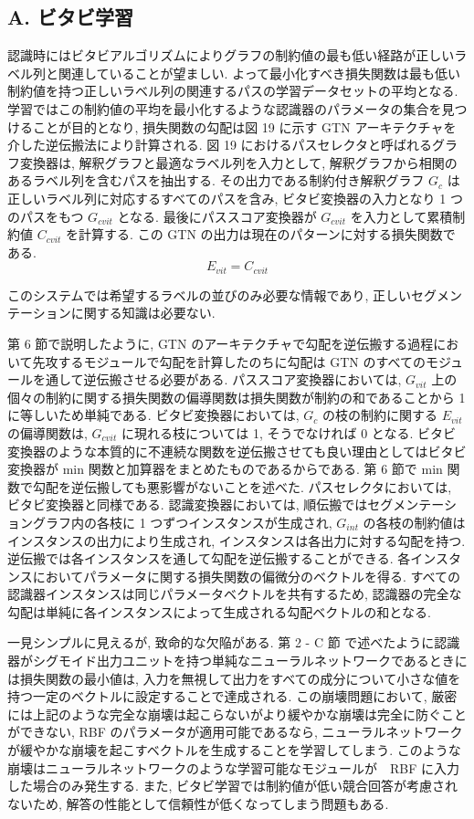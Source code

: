 \documentclass[twocolumn]{jarticle}     %
\begin{document}
\subsection*{A. ビタビ学習}
認識時にはビタビアルゴリズムによりグラフの制約値の最も低い経路が正しいラベル列と関連していることが望ましい. よって最小化すべき損失関数は最も低い制約値を持つ正しいラベル列の関連するパスの学習データセットの平均となる. 学習ではこの制約値の平均を最小化するような認識器のパラメータの集合を見つけることが目的となり, 損失関数の勾配は図 19 に示す GTN アーキテクチャを介した逆伝搬法により計算される. 
図 19 におけるパスセレクタと呼ばれるグラフ変換器は, 解釈グラフと最適なラベル列を入力として, 解釈グラフから相関のあるラベル列を含むパスを抽出する. 
その出力である制約付き解釈グラフ $G_c$ は正しいラベル列に対応するすべてのパスを含み, ビタビ変換器の入力となり 1 つのパスをもつ $G_{cvit}$ となる.
最後にパススコア変換器が $G_{cvit}$ を入力として累積制約値 $C_{cvit}$ を計算する. この GTN の出力は現在のパターンに対する損失関数である.
\begin{equation}
  E_{vit} = C_{cvit}
\end{equation}

このシステムでは希望するラベルの並びのみ必要な情報であり, 正しいセグメンテーションに関する知識は必要ない.
\par
第 6 節で説明したように, GTN のアーキテクチャで勾配を逆伝搬する過程において先攻するモジュールで勾配を計算したのちに勾配は GTN のすべてのモジュールを通して逆伝搬させる必要がある.
パススコア変換器においては, $G_{vit}$ 上の個々の制約に関する損失関数の偏導関数は損失関数が制約の和であることから 1 に等しいため単純である.
ビタビ変換器においては, $G_c$ の枝の制約に関する $E_{vit}$ の偏導関数は, $G_{cvit}$ に現れる枝については 1, そうでなければ 0 となる.
ビタビ変換器のような本質的に不連続な関数を逆伝搬させても良い理由としてはビタビ変換器が min 関数と加算器をまとめたものであるからである. 第 6 節で min 関数で勾配を逆伝搬しても悪影響がないことを述べた. 
パスセレクタにおいては, ビタビ変換器と同様である.
認識変換器においては, 順伝搬ではセグメンテーショングラフ内の各枝に 1 つずつインスタンスが生成され, $G_{int}$ の各枝の制約値はインスタンスの出力により生成され, インスタンスは各出力に対する勾配を持つ. 逆伝搬では各インスタンスを通して勾配を逆伝搬することができる. 各インスタンスにおいてパラメータに関する損失関数の偏微分のベクトルを得る. すべての認識器インスタンスは同じパラメータベクトルを共有するため, 認識器の完全な勾配は単純に各インスタンスによって生成される勾配ベクトルの和となる. 
\par
一見シンプルに見えるが, 致命的な欠陥がある. 第 2 - C 節 で述べたように認識器がシグモイド出力ユニットを持つ単純なニューラルネットワークであるときには損失関数の最小値は, 入力を無視して出力をすべての成分について小さな値を持つ一定のベクトルに設定することで達成される.
この崩壊問題において, 厳密には上記のような完全な崩壊は起こらないがより緩やかな崩壊は完全に防ぐことができない, RBF のパラメータが適用可能であるなら, ニューラルネットワークが緩やかな崩壊を起こすベクトルを生成することを学習してしまう. 
このような崩壊はニューラルネットワークのような学習可能なモジュールが　RBF に入力した場合のみ発生する.
また, ビタビ学習では制約値が低い競合回答が考慮されないため, 解答の性能として信頼性が低くなってしまう問題もある.
\end{document}
